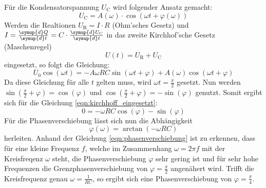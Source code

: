     \noindent Für die Kondensatorspannung $U_{\text{C}}$ wird folgender Ansatz gemacht:
    \begin{equation*}
        U_{\text{C}} = A (\omega) \cdot \cos( \omega t + \varphi(\omega) )
    \end{equation*}
    Werden die Realtionen $U_{\text{R}} = I \cdot R $ (Ohm'sches Gesetz) und $I = \frac{\symup{d}Q}{\symup{d}t} = C \cdot \frac{\symup{d}U_{\text{C}}}{\symup{d}t}$
    in das zweite Kirchhof'sche Gesetz (Maschenregel) 
    \begin{equation*}
        U(t) = U_{\text{R}} + U_{\text{C}}
    \end{equation*}
    eingesetzt, so folgt die Gleichung:
    \begin{equation}\label{eqn:kirchhoff_eingesetzt}
        U_0 \cos(\omega t) = -A \omega R C \sin(\omega t + \varphi) + A(\omega) \cos(\omega t + \varphi)
    \end{equation}
    Da diese Gleichung für alle $t$ gelten muss, wird $\omega t = \frac{\pi}{2} $ gesetzt. Nun werden $\sin(\frac{\pi}{2} + \varphi) = \cos(\varphi)$ und 
    $\cos(\frac{\pi}{2} + \varphi) = -\sin(\varphi)$ genutzt. Somit ergibt sich für die Gleichung \eqref{eqn:kirchhoff_eingesetzt}:
    \begin{equation*}
        0 = - \omega RC \cos(\varphi) - \sin(\varphi)
    \end{equation*}
    Für die Phasenverschiebung lässt sich nun die Abhängigkeit 
    \begin{equation} \label{eqn:phasenverschiebung}
        \varphi(\omega) = \arctan(-\omega R C)
    \end{equation}
    herleiten. Anhand der Gleichung \eqref{eqn:phasenverschiebung} ist zu erkennen, dass für eine kleine Frequenz $f$, welche im Zusammenhang $\omega = 2\pi f$ mit 
    der Kreisfreqenz $\omega$ steht, die Phasenverschiebung $\varphi$ sehr gering ist und für sehr hohe Frequenzen die Grenzphasenverschiebung von 
    $\varphi = \frac{\pi}{2}$ angenähert wird. Trifft die Kreisfrequenz genau $\omega = \frac{1}{RC}$, so ergibt sich eine Phasenverschiebung von $\varphi = \frac{\pi}{4}$.


